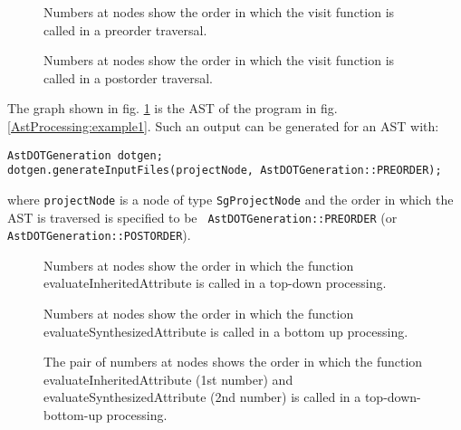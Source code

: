 \begin{figure}
\centerline{}
\caption{Numbers at nodes show the order in which the visit function is called in a preorder traversal.}
\label{AstProcessing:PreorderAst}
\end{figure}

\begin{figure}
\centerline{}
\caption{Numbers at nodes show the order in which the visit function is called in a postorder traversal.}
\label{introduction:PostorderAst}
\end{figure}

The graph shown in fig. \ref{AstProcessing:PreorderAst} is the AST of
the program in fig. \ref{AstProcessing:example1}. Such an output can
be generated for an AST with:

\begin{verbatim}
AstDOTGeneration dotgen;
dotgen.generateInputFiles(projectNode, AstDOTGeneration::PREORDER);
\end{verbatim}

where {\tt projectNode} is a node of type {\tt SgProjectNode} and the
order in which the AST is traversed is specified to be {\tt
AstDOTGeneration::PREORDER} (or {\tt AstDOTGeneration::POSTORDER}).

\begin{figure}
\centerline{}
\caption{Numbers at nodes show the order in which the function evaluateInheritedAttribute is called in a top-down processing.}
\label{AstProcessing:TopDownAst}
\end{figure}

\begin{figure}
\centerline{}
\caption{Numbers at nodes show the order in which the function evaluateSynthesizedAttribute is called in a bottom up processing.}
\label{AstProcessing:BottomUpAst}
\end{figure}

\begin{figure}
\centerline{}
\caption{The pair of numbers at nodes shows the order in which the function evaluateInheritedAttribute (1st number) and evaluateSynthesizedAttribute (2nd number) is called in a top-down-bottom-up processing.}
\label{AstProcessing:TopDownBottomUpAst}
\end{figure}

